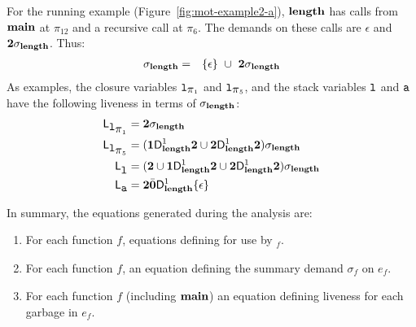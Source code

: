 \documentclass[9pt,preprint,letter,nonatbib]{sigplanconf}
\begin{document}


For  the  running  example (Figure~\ref{fig:mot-example2-a}),  $\mathbf{length}$  has  calls  from  $\mathbf{main}$  at
$\pi_{12}$ and a recursive call at $\pi_6$. The demands on these calls
are $\epsilon$ and ${\mathbf{2}}\sigma_{\mathit{\mathbf{length}}}$. Thus:
\begin{eqnarray*}
\sigma_{\mathbf{length}}    &=&
 \{\epsilon\}  ~\cup~{{\mathbf{2}}\sigma_{\mathit{\mathbf{length}}}}
\end{eqnarray*}
As examples, the closure variables $\mbox{\tt l}_{\mbox{$\pi$}_1}$ and $\mbox{\tt l}_{\mbox{$\pi$}_5}$, and the
stack variables $\mbox{\tt l}$ and $\mbox{\tt a}$ have the following liveness in terms
of  $\sigma_{\mathbf{length}}$:
\begin{align*}
  \mathsf{L}_{\mbox{\tt l}_{\mbox{$\pi$}_1}} &= {\mathbf{2}}\sigma_{\mathit{\mathbf{length}}} \\
  \mathsf{L}_{\mbox{\tt l}_{\mbox{$\pi$}_5}} &=  (\mathbf{1}\mathsf{D}_{\mathit {\mathbf{length}}}^{1}{{\mathbf{2}}} \cup
  {\mathbf{2}}\mathsf{D}_{\mathit {\mathbf{length}}}^{1}{{\mathbf{2}}}) \sigma_{\mathit{\mathbf{length}}} \\
  \mathsf{L}_{{\mbox{\tt l}}}^{} &= ({\mathbf{2}} \cup \mathbf{1}\mathsf{D}_{\mathit {\mathbf{length}}}^{1}{\mathbf{2}}
  \cup {\mathbf{2}}\mathsf{D}_{\mathit {\mathbf{length}}}^{1}{{\mathbf{2}}})\sigma_{\mathit{\mathbf{length}}} \\
  \mathsf{L}_{{\mbox{\tt a}}}^{} &= {\mathbf{2}} \bar{\mathbf{0}} \mathsf{D}_{\mathit {\mathbf{length}}}^{1}\{\epsilon\}
\end{align*}

In  summary, the  equations  generated during the
analysis are:
\begin{enumerate}
\item   For  each   function  $\mathit{f}$,   equations
  defining  for use by \Lfonly$_{\mathit f}$.
\item For each function $\mathit{f}$, an equation defining the summary
  demand $\sigma_{\mathit f}$ on $e_f$.
\item   For  each   function  $\mathit{f}$   (including
  $\mathbf{main}$) an  equation  defining
  liveness for each garbage in  $e_{\mathit f}$.
\end{enumerate}
\end{document}
